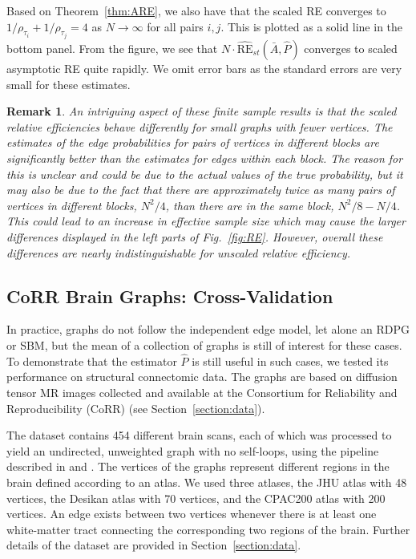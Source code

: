 \documentclass[10pt,letterpaper]{article}
\newtheorem{remark}[fact]{Remark}
\renewcommand{\hat}{\widehat}
\begin{document}
Based on Theorem~\ref{thm:ARE}, we also have that the scaled RE converges to $1/\rho_{\tau_i}+1/\rho_{\tau_j}=4$ as $N\to\infty$ for all pairs $i,j$.
This is plotted as a solid line in the bottom panel.
From the figure, we see that $N \cdot \hat{\mathrm{RE}}_{st}(\bar{A}, \hat{P})$ converges to scaled asymptotic RE quite rapidly.
We omit error bars as the standard errors are very small for these estimates.

\begin{remark}
An intriguing aspect of these finite sample results is that the scaled relative efficiencies behave differently for small graphs with fewer vertices. 
The estimates of the edge probabilities for pairs of vertices in different blocks are significantly better than the estimates for edges within each block.
The reason for this is unclear and could be due to the actual values of the true probability, but it may also be due to the fact that there are approximately twice as many pairs of vertices in different blocks, $N^2/4$, than there are in the same block, $N^2/8-N/4$.
This could lead to an increase in effective sample size which may cause the larger differences displayed in the left parts of Fig.~\ref{fig:RE}.
However, overall these differences are nearly indistinguishable for unscaled relative efficiency.
\end{remark}


\subsection{CoRR Brain Graphs: Cross-Validation}\label{sec:corr_data}
In practice, graphs do not follow the independent edge model, let alone an RDPG or SBM, but the mean of a collection of graphs is still of interest for these cases.
To demonstrate that the estimator $\hat{P}$ is still useful in such cases, we tested its performance on structural connectomic data. 
The graphs are based on diffusion tensor MR images collected and available at the Consortium for Reliability and Reproducibility (CoRR) \citep{zuo2014open, gorgolewski2015high} (see Section~\ref{section:data}).

The dataset contains 454 different brain scans, each of which was processed to yield an undirected, unweighted graph with no self-loops, using the pipeline described in \citet{gray2013migraine} and \citet{kiar2016m2g}.
The vertices of the graphs represent different regions in the brain defined according to an atlas.
We used three atlases, the JHU atlas with 48 vertices, the Desikan atlas with 70 vertices, and the  CPAC200 atlas with 200 vertices.
An edge exists between two vertices whenever there is at least one white-matter tract connecting the corresponding two regions of the brain. 
Further details of the dataset are provided in Section~\ref{section:data}.
\end{document}
